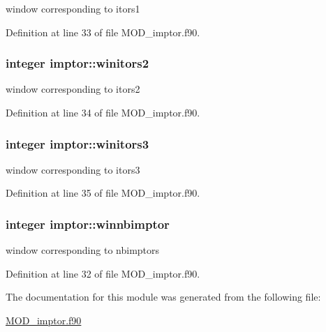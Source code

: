 window corresponding to itors1 



Definition at line 33 of file M\-O\-D\-\_\-imptor.\-f90.

\hypertarget{classimptor_a81454398c2572817c0a7a2ff0820a4b5}{
\subsubsection[{winitors2}]{\setlength{\rightskip}{0pt plus 5cm}integer imptor\-::winitors2}}\label{classimptor_a81454398c2572817c0a7a2ff0820a4b5}


window corresponding to itors2 



Definition at line 34 of file M\-O\-D\-\_\-imptor.\-f90.

\hypertarget{classimptor_a84ab3e374ca6d4e829a5452adee96903}{
\subsubsection[{winitors3}]{\setlength{\rightskip}{0pt plus 5cm}integer imptor\-::winitors3}}\label{classimptor_a84ab3e374ca6d4e829a5452adee96903}


window corresponding to itors3 



Definition at line 35 of file M\-O\-D\-\_\-imptor.\-f90.

\hypertarget{classimptor_af899feb39d06c7c9761742b50128b524}{
\subsubsection[{winnbimptor}]{\setlength{\rightskip}{0pt plus 5cm}integer imptor\-::winnbimptor}}\label{classimptor_af899feb39d06c7c9761742b50128b524}


window corresponding to nbimptors 



Definition at line 32 of file M\-O\-D\-\_\-imptor.\-f90.



The documentation for this module was generated from the following file\-:\begin{DoxyCompactItemize}
\item 
\hyperlink{MOD__imptor_8f90}{M\-O\-D\-\_\-imptor.\-f90}\end{DoxyCompactItemize}
